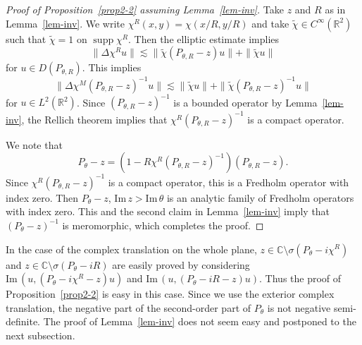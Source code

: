 \documentclass{article}
\theoremstyle{plain}
\theoremstyle{definition}
\theoremstyle{remark}
\newcommand{\RR}{\mathbb{R}}
\newcommand{\CC}{\mathbb{C}}
\newcommand{\Cinf}{C^{\infty}}
\newcommand{\supp}{\mathop{\mathrm{supp}}}
\newcommand{\IM}{\mathrm{Im}\,}
\begin{document}
\begin{proof}[Proof of Proposition~\ref{prop2-2} assuming Lemma~\ref{lem-inv}]
Take $z$ and $R$ as in Lemma~\ref{lem-inv}. We write $\chi^R(x, y)=\chi(x/R, y/R)$ and 
take $\tilde{\chi}\in \Cinf(\RR^2)$ such that 
$\tilde{\chi}=1$ on $\supp \chi^R$.  
Then the elliptic estimate implies 
\[
\| \Delta \chi^R u\|\lesssim \|\tilde{\chi}(P_{\theta, R}-z)u\|+\|\tilde{\chi} u\|
\]
for $u\in D(P_{\theta, R})$. This implies 
\[
\|\Delta\chi^M (P_{\theta, R}-z)^{-1} u\|\lesssim \|\tilde{\chi}u\|+\|\tilde{\chi} (P_{\theta, R}-z)^{-1}u\|
\]
for $u\in L^2(\RR^2)$. 
Since $(P_{\theta, R}-z)^{-1}$ is a bounded operator by Lemma~\ref{lem-inv}, the Rellich theorem implies that 
$\chi^R (P_{\theta, R}-z)^{-1}$ is a compact operator. 

We note that 
\[
P_{\theta}-z=(1-R\chi^R(P_{\theta, R}-z)^{-1})(P_{\theta, R}-z). 
\]
Since $\chi^R (P_{\theta, R}-z)^{-1}$ is a compact operator, this is a Fredholm operator with index zero. 
Then $P_{\theta}-z$, $\IM z>\IM \theta$ is an analytic family of Fredholm operators with index zero. 
This and the second claim in Lemma~\ref{lem-inv} imply that $(P_{\theta}-z)^{-1}$ is meromorphic, which completes the proof. 
\end{proof} 

In the case of the complex translation on the whole plane, 
$z \in \CC\setminus \sigma(P_{\theta}-i\chi^R)$ and $z \in \CC\setminus \sigma(P_{\theta}-iR)$ are easily proved 
by considering $\IM (u, (P_{\theta}-i\chi^R-z)u)$ and $\IM (u, (P_{\theta}-iR-z)u)$. 
Thus the proof of Proposition~\ref{prop2-2} is easy in this case. 
Since we use the exterior complex translation, the negative part of the second-order part of $P_{\theta}$ is not 
negative semi-definite. The proof of Lemma~\ref{lem-inv} does not seem easy and postponed to the next subsection. 
\end{document}
